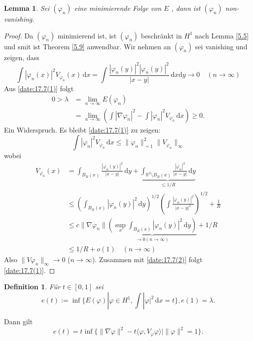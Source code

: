 \documentclass[
paper=a4,
bibtotocnumbered,
liststotocnumbered,
tablecaptionabove,
pointlessnumbers,
twoside,
openright,
10pt
]
{report}
\let\phi\varphi
\newtheorem{lem}[thm]{Lemma}
\newtheorem{df}[thm]{Definition}
\theoremstyle{definition}
\numberwithin{equation}{chapter}
\begin{document}
\begin{lem}\label{5.10}
Sei $(\phi_n)$ eine minimierende Folge von $E$ , dann ist $(\phi_n)$ non-vanishing.
\end{lem}
\begin{proof}
Da $(\phi_n)$ minimierend ist, ist $(\phi_n)$ beschränkt in $H^1$ nach Lemma \ref{5.5} und smit ist Theorem \ref{5.9} anwendbar. Wir nehmen an $(\phi_n)$ sei vanishing und zeigen, dass 
\begin{equation}\label{date:17.7(1)}
\int |\phi_n(x)|^2 V_{\phi_n} (x) \,\mathrm dx = \int \frac{|\phi_n(y)|^2 |\phi_n(y)|^2}{|x-y|}\, \mathrm dx \mathrm dy \to 0 \quad (n\to \infty)
\end{equation}
Aus \eqref{date:17.7(1)} folgt
\begin{align*}
0 >\lambda &= \lim_{n\to \infty} E(\phi_n)\\
&= \lim_{n\to \infty} ( \int |\nabla \phi_n|^2 - \int |\phi_n|^2 V_{\phi_n} \, \mathrm dx) \ge 0.
\end{align*}
Ein Widerspruch. Es bleibt \eqref{date:17.7(1)} zu zeigen:
\begin{equation}\label{date:17.7(2)}
\int |\phi_n|^2 V_{\phi_n} \, \mathrm dx \le \| \phi_n\|^2_{=1} \| V_{\phi_n} \|_\infty
\end{equation}
wobei
\begin{align}
V_{\phi_n} (x) &= \int_{B _R(x)} \frac{|\phi_n(y)|^2}{|x-y|}\, \mathrm dy +\underbrace{\int_{\mathbb R^3\setminus B_R(x)}\frac{|\phi_n|^2}{|x-y|} \, \mathrm dy}_{\le 1/R}\\
&\le \left (\int_{B_R(x)} |\phi_n(y)|^2 \, \mathrm dy \right )^{1/2} \left ( \int \frac{|\phi_n(y)|^2}{|x-y|^2} \right )^{1/2} + \frac{1}{R}\\
&\le c \| \nabla \phi_n\| \underbrace{\left ( \sup_x \int_{B_R(x)} |\phi_n(y)|^2\, \mathrm dy \right )}_{\to 0 (n\to \infty)} + 1/R\\
&\le 1/R + o(1) \quad (n\to \infty)
\end{align}
Also $\| V\phi_n \|_\infty \to 0$ ($n\to \infty$).  Zusammen mit \eqref{date:17.7(2)} folgt \eqref{date:17.7(1)}.
\end{proof}
\begin{df}
Für $t\in [0,1]$ sei
\begin{equation}\label{date:17.7(**)}
e(t):= \inf\{E(\phi) |\phi \in H^1, \int |\phi|^2\, \mathrm dx =t\}, e(1) = \lambda.
\end{equation}
\end{df}
Dann gilt $$e(t) = t \inf\{ \| \nabla \phi\|^2- t\langle \phi, V_\phi \phi\rangle |\| \phi\|^2 =1\}.$$
\end{document}
